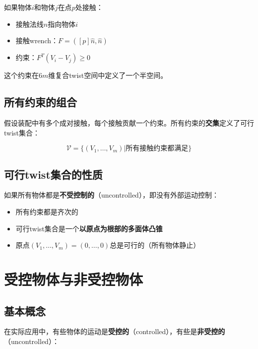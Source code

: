 \documentclass[12pt,a4paper]{article}
\begin{document}
如果物体$i$和物体$j$在点$p$处接触：
\begin{itemize}
\item 接触法线$\hat{n}$指向物体$i$
\item 接触wrench：$F = ([p]\hat{n}, \hat{n})$
\item 约束：$F^T (V_i - V_j) \geq 0$
\end{itemize}

这个约束在$6m$维复合twist空间中定义了一个半空间。

\subsection{所有约束的组合}

假设装配中有多个成对接触，每个接触贡献一个约束。所有约束的\textbf{交集}定义了可行twist集合：

\begin{equation}
\mathcal{V} = \{(V_1, \ldots, V_m) | \text{所有接触约束都满足}\}
\label{eq:assembly_feasible}
\end{equation}

\subsection{可行twist集合的性质}

如果所有物体都是\textbf{不受控制的}（uncontrolled），即没有外部运动控制：
\begin{itemize}
\item 所有约束都是齐次的
\item 可行twist集合是一个\textbf{以原点为根部的多面体凸锥}
\item 原点$(V_1, \ldots, V_m) = (0, \ldots, 0)$总是可行的（所有物体静止）
\end{itemize}

\section{受控物体与非受控物体}

\subsection{基本概念}

在实际应用中，有些物体的运动是\textbf{受控的}（controlled），有些是\textbf{非受控的}（uncontrolled）：
\end{document}
